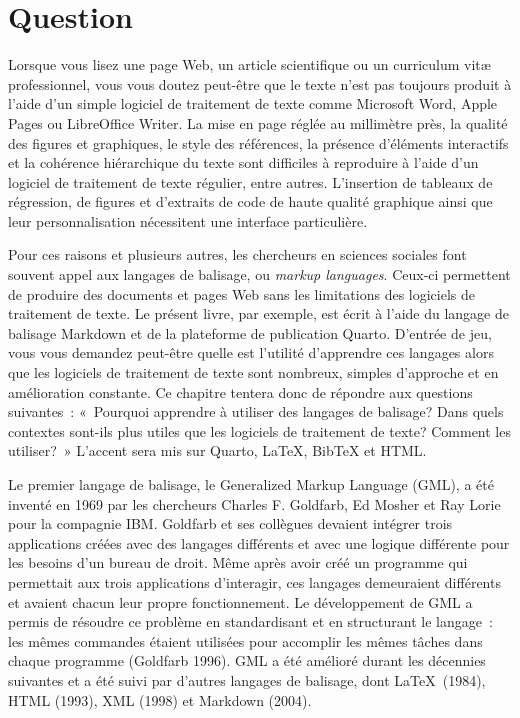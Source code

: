 \documentclass[
  letterpaper,
]{scrbook}
\begin{document}
\hypertarget{question}{%
\section{Question}\label{question}}

Lorsque vous lisez une page Web, un article scientifique ou un
curriculum vitæ professionnel, vous vous doutez peut-être que le texte
n'est pas toujours produit à l'aide d'un simple logiciel de traitement
de texte comme Microsoft Word, Apple Pages ou LibreOffice Writer. La
mise en page réglée au millimètre près, la qualité des figures et
graphiques, le style des références, la présence d'éléments interactifs
et la cohérence hiérarchique du texte sont difficiles à reproduire à
l'aide d'un logiciel de traitement de texte régulier, entre autres.
L'insertion de tableaux de régression, de figures et d'extraits de code
de haute qualité graphique ainsi que leur personnalisation nécessitent
une interface particulière.

Pour ces raisons et plusieurs autres, les chercheurs en sciences
sociales font souvent appel aux langages de balisage, ou \emph{markup
languages}. Ceux-ci permettent de produire des documents et pages Web
sans les limitations des logiciels de traitement de texte. Le présent
livre, par exemple, est écrit à l'aide du langage de balisage Markdown
et de la plateforme de publication Quarto. D'entrée de jeu, vous vous
demandez peut-être quelle est l'utilité d'apprendre ces langages alors
que les logiciels de traitement de texte sont nombreux, simples
d'approche et en amélioration constante. Ce chapitre tentera donc de
répondre aux questions suivantes~: «~Pourquoi apprendre à utiliser des
langages de balisage? Dans quels contextes sont-ils plus utiles que les
logiciels de traitement de texte? Comment les utiliser?~» L'accent sera
mis sur Quarto, \LaTeX, BibTeX et HTML.

Le premier langage de balisage, le Generalized Markup Language (GML), a
été inventé en 1969 par les chercheurs Charles F. Goldfarb, Ed Mosher et
Ray Lorie pour la compagnie IBM. Goldfarb et ses collègues devaient
intégrer trois applications créées avec des langages différents et avec
une logique différente pour les besoins d'un bureau de droit. Même après
avoir créé un programme qui permettait aux trois applications
d'interagir, ces langages demeuraient différents et avaient chacun leur
propre fonctionnement. Le développement de GML a permis de résoudre ce
problème en standardisant et en structurant le langage~: les mêmes
commandes étaient utilisées pour accomplir les mêmes tâches dans chaque
programme (Goldfarb 1996). GML a été amélioré durant les décennies
suivantes et a été suivi par d'autres langages de balisage, dont
\LaTeX~(1984), HTML (1993), XML (1998) et Markdown (2004).
\end{document}
